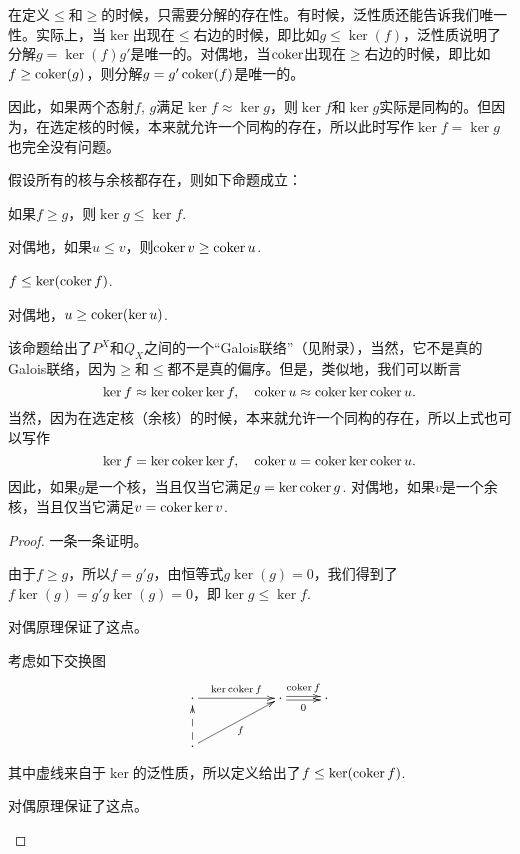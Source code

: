 \begin{para}
在定义$\leq$和$\geq$的时候，只需要分解的存在性。有时候，泛性质还能告诉我们唯一性。实际上，当$\ker$出现在$\leq$右边的时候，即比如$g\leq \ker(f)$，泛性质说明了分解$g=\ker(f)g'$是唯一的。对偶地，当$\operatorname{coker}$出现在$\geq$右边的时候，即比如$f\geq \operatorname{coker}(g)$，则分解$g=g'\operatorname{coker}(f)$是唯一的。
\end{para}

因此，如果两个态射$f$, $g$满足$\ker f\approx \ker g$，则$\ker f$和$\ker g$实际是同构的。但因为，在选定核的时候，本来就允许一个同构的存在，所以此时写作$\ker f=\ker g$也完全没有问题。

\begin{pro}\label{glgl}假设所有的核与余核都存在，则如下命题成立：
\begin{compactenum}[~~~(1)]
\item 如果$f\geq g$，则$\ker g \leq \ker f$. 
\item 对偶地，如果$u\leq v$，则$\operatorname{coker} v \geq \operatorname{coker} u$. 
\item $f\leq \ker(\operatorname{coker} f)$.
\item 对偶地，$u\geq \operatorname{coker}(\ker u)$.
\end{compactenum}
\end{pro}

该命题给出了$P^X$和$Q_X$之间的一个“Galois联络”（见附录），当然，它不是真的Galois联络，因为$\geq$和$\leq$都不是真的偏序。但是，类似地，我们可以断言
\[
	\ker f\approx \ker \operatorname{coker} \ker f,\quad \operatorname{coker} u \approx \operatorname{coker} \ker \operatorname{coker} u.
\]
当然，因为在选定核（余核）的时候，本来就允许一个同构的存在，所以上式也可以写作
\begin{equation}\label{kck}
\ker f= \ker \operatorname{coker} \ker f,\quad \operatorname{coker} u = \operatorname{coker} \ker \operatorname{coker} u.
\end{equation}
因此，如果$g$是一个核，当且仅当它满足$g=\ker \operatorname{coker} g$. 对偶地，如果$v$是一个余核，当且仅当它满足$v = \operatorname{coker} \ker v$.

\begin{proof}一条一条证明。
\begin{compactenum}[~~~(1)]
\item 由于$f\geq g$，所以$f=g'g$，由恒等式$g\ker(g)=0$，我们得到了$f\ker(g)=g'g\ker(g)=0$，即$\ker g\leq \ker f$. 
\item 对偶原理保证了这点。
\item 考虑如下交换图
\[
\begin{xy}
	\xymatrix{
	\cdot \ar[rr]^-{\ker \coker f}&&\cdot \ar@<0.3ex>[r]^-{\coker f} \ar@<-0.3ex>[r]_-{0}&\cdot \\
	\cdot \ar@{-->}[u]\ar[urr]_f
	}
\end{xy}
\]
其中虚线来自于$\ker$的泛性质，所以定义给出了$f\leq \ker(\operatorname{coker} f)$.
\item 对偶原理保证了这点。
\end{compactenum}
\end{proof}

